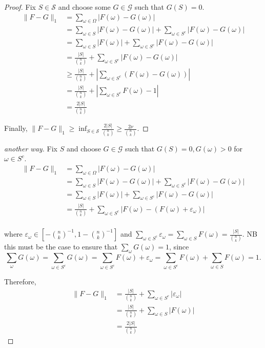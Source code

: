 \documentclass[12pt]{article}
\newcommand{\eps}{\varepsilon}
\begin{document}
\begin{proof}
Fix $S \in \mathcal{S}$ and choose some $G \in \mathcal{G}$ such that $G(S) = 0$.
\begin{align*}
\lVert F - G \rVert_1 &= \sum_{\omega \in \Omega} \lvert F(\omega) - G(\omega) \rvert \\
&= \sum_{\omega \in S} \lvert F(\omega) - G(\omega) \rvert + \sum_{\omega \in S^c} \lvert F(\omega) - G(\omega) \rvert\\
&= \sum_{\omega \in S} \lvert F(\omega) \rvert + \sum_{\omega \in S^c} \lvert F(\omega) - G(\omega) \rvert\\
&= \frac{ \lvert S \rvert}{{n \choose k}}+ \sum_{\omega \in S^c} \lvert F(\omega) - G(\omega) \rvert\\
&\geq \frac{ \lvert S \rvert}{{n \choose k}}+ \left\lvert\sum_{\omega \in S^c} \left( F(\omega) - G(\omega) \right)\right\rvert\\
&= \frac{ \lvert S \rvert}{{n \choose k}}+ \left\lvert\sum_{\omega \in S^c} F(\omega) - 1 \right\rvert\\
&= \frac{2 \lvert S \rvert}{{n \choose k}}
\end{align*}

Finally, $ \lVert F - G \rVert_1 \geq \inf_{S \in \mathcal{S}} \frac{2 \lvert S \rvert}{{n \choose k}} \geq \frac{2\nu}{{n \choose k}}$.
\end{proof}

\begin{proof}[another way]
Fix $S$ and choose $G \in \mathcal{G}$ such that $G(S) = 0, G(\omega) > 0$ for $\omega \in S^c$.
\begin{align*}
\lVert F - G \rVert_1 &= \sum_{\omega \in \Omega} \lvert F(\omega) - G(\omega) \rvert \\
&= \sum_{\omega \in S} \lvert F(\omega) - G(\omega) \rvert + \sum_{\omega \in S^c} \lvert F(\omega) - G(\omega) \rvert\\
&= \sum_{\omega \in S} \lvert F(\omega) \rvert + \sum_{\omega \in S^c} \lvert F(\omega) - G(\omega) \rvert\\
&= \frac{ \lvert S \rvert}{{n \choose k}}+ \sum_{\omega \in S^c} \lvert F(\omega) - (F(\omega) + \eps_\omega) \rvert\\
\end{align*}

\noindent where $\eps_\omega \in [ - {n \choose k}^{-1}, 1 - {n\choose k}^{-1}]$ and $\sum_{\omega \in S^c} \eps_\omega = \sum_{\omega \in S} F(\omega) =  \frac{ \lvert S \rvert}{{n \choose k}}$.
NB this must be the case to ensure that $\sum_{\omega} G(\omega) = 1$, since
$$\sum_{\omega} G(\omega) =\sum_{\omega\in S^c} G(\omega) = \sum_{\omega\in S^c} F(\omega) + \eps_\omega = \sum_{\omega\in S^c} F(\omega) + \sum_{\omega\in S} F(\omega) = 1.$$

Therefore,
\begin{align*}
\lVert F - G \rVert_1 &= \frac{ \lvert S \rvert}{{n \choose k}}+ \sum_{\omega \in S^c} \lvert \eps_\omega \rvert\\
&=  \frac{ \lvert S \rvert}{{n \choose k}}+ \sum_{\omega \in S} \lvert F(\omega) \rvert \\
&= \frac{2 \lvert S \rvert}{{n \choose k}}
\end{align*}
\end{proof}
\end{document}

